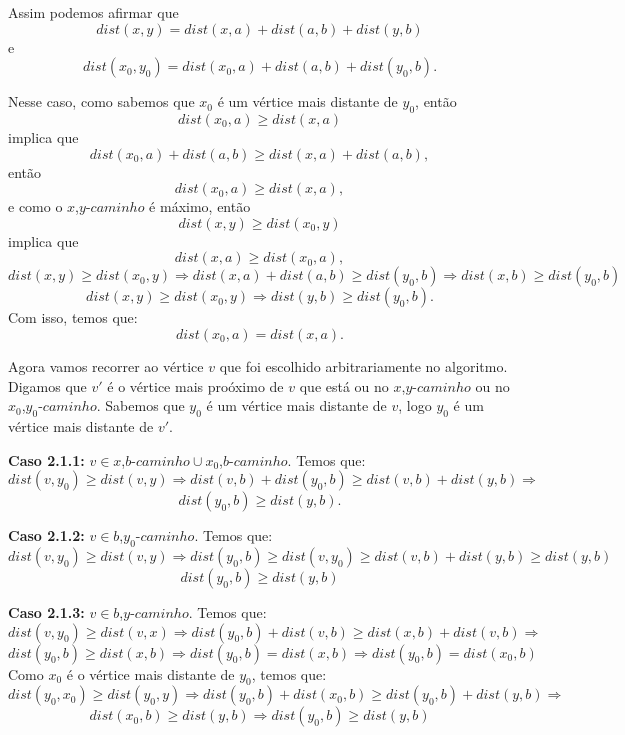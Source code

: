 \documentclass[a4paper,12pt]{article}
\begin{document}
\begin{itemize}
\begin{center}
 \end{center}
		
		Assim podemos afirmar que 
		$$ dist(x,y) = dist(x,a) + dist(a,b) + dist(y,b) $$ e
        $$ dist(x_0,y_0) = dist(x_0,a) + dist(a,b) + 
        dist(y_0,b).$$

		Nesse caso, como sabemos que $x_0$ é um vértice mais
		distante de $y_0$, então
		$$  dist(x_0,a)\ge dist(x,a) $$
		implica que
		$$dist(x_0,a) + dist(a,b)\ge dist(x,a) + dist(a,b),$$
		então
		$$ dist(x_0,a)\ge dist(x,a), $$
		e como o $x$,$y$-$caminho$ é máximo, então
		$$  dist(x,y)\ge dist(x_0,y)$$ 
		implica que
		$$dist(x,a)\ge dist(x_0,a), $$ 
		$$  dist(x,y)\ge dist(x_0,y) \Rightarrow 
		dist(x,a) + dist(a,b)\ge dist(y_0,b)\Rightarrow
		dist(x,b)\ge dist(y_0,b) $$
		$$  dist(x,y)\ge dist(x_0,y) \Rightarrow 
		dist(y,b)\ge dist(y_0,b). $$
		Com isso, temos que: $$dist(x_0,a)=dist(x,a).$$

		Agora vamos recorrer ao vértice $v$
		que foi escolhido arbitrariamente no algoritmo.
		Digamos que $v'$ é o vértice mais proóximo de $v$ 
		que está ou no
		$x$,$y$-$caminho$ ou no $x_0$,$y_0$-$caminho$.
		Sabemos que $y_0$ é um vértice mais distante de $v$,
		logo $y_0$ é um vértice mais distante de $v'$. 
		
		\textbf{Caso 2.1.1:}
		$v\in x$,$b$-$caminho\cup x_0$,$b$-$caminho$. Temos que:
		$$ dist(v,y_0)\ge dist(v,y) \Rightarrow
		dist(v,b)+dist(y_0,b)\ge dist(v,b) + dist(y,b) 
		\Rightarrow$$
		$$ dist(y_0,b)\ge dist(y,b).$$

		\textbf{Caso 2.1.2:} $v\in b$,$y_0$-$caminho$. 
		Temos que:
		$$ dist(v,y_0)\ge dist(v,y) \Rightarrow
		dist(y_0,b)\ge dist(v,y_0)\ge 
		dist(v,b) + dist(y,b)\ge dist(y,b) $$
		$$ dist(y_0,b)\ge dist(y,b) $$

		\textbf{Caso 2.1.3:}
		$v\in b$,$y$-$caminho$. Temos que:
		$$ dist(v,y_0)\ge dist(v,x) \Rightarrow
		dist(y_0,b)+dist(v,b)\ge dist(x,b)+dist(v,b)
		\Rightarrow $$
		$$ dist(y_0,b)\ge dist(x,b) \Rightarrow
		dist(y_0,b) = dist(x,b) \Rightarrow 
		dist(y_0,b) = dist(x_0,b) $$
		Como  $x_0$ é o vértice mais distante de $y_0$, temos
		que:
		$$ dist(y_0,x_0)\ge dist(y_0,y) \Rightarrow
		dist(y_0,b) + dist(x_0,b)\ge dist(y_0,b) + dist(y,b)
		\Rightarrow $$
		$$ dist(x_0,b)\ge dist(y,b) \Rightarrow 
		dist(y_0,b)\ge dist(y,b) $$


\end{itemize}
\end{document}

